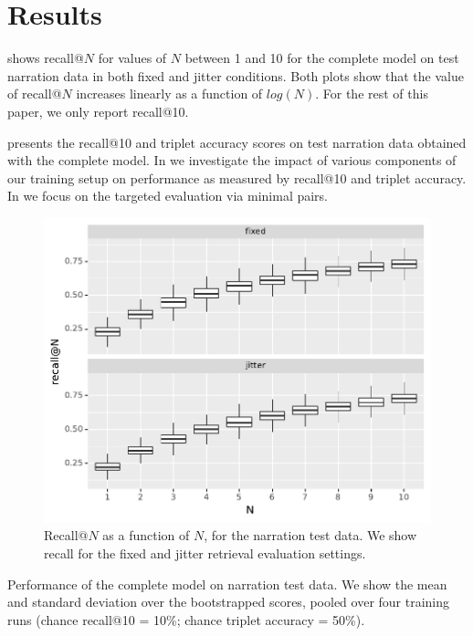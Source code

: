 \section{Results}
\label{sec:results}

 shows recall@$N$ for values of $N$
between 1 and 10 for the complete model on test narration data in both 
{\sc fixed} and {\sc jitter} conditions. Both plots show that the value of 
recall@$N$ increases linearly as a function of $log(N)$. For the rest 
of this paper, we only report recall@10.

 presents the recall@10 and triplet accuracy
scores on test narration data obtained with the complete
model. In  we investigate the impact
of various components of our training setup on performance as measured
by recall@10 and triplet accuracy.  In  we
focus on the targeted evaluation via minimal pairs.



\begin{figure}[htb]
  \centering
  \includegraphics[width=\columnwidth]{results/recall_at_1_to_n_test.pdf}
  \caption{Recall@$N$ as a function of $N$, for the narration test
    data. We show recall for the {\sc fixed} and {\sc jitter}
    retrieval evaluation settings. }
  \label{fig:recall_at_1_to_n}
\end{figure}

\begin{table}[htb]
  
  \caption{Performance of the complete model on narration test
  	data. We show the mean and standard deviation over the
  	bootstrapped scores, pooled over four training runs
	(chance recall@10 = 10\%; chance triplet accuracy = 50\%).}
  \label{tab:test_scores}
\end{table}



